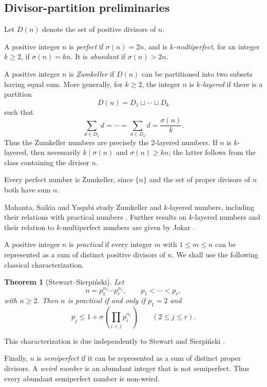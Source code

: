 \documentclass[11pt,reqno]{amsart}
\numberwithin{equation}{section}
\theoremstyle{plain}
\newtheorem{theorem}{Theorem}[section]
\theoremstyle{definition}
\theoremstyle{remark}
\begin{document}
\subsection{Divisor-partition preliminaries}

Let $D(n)$ denote the set of positive divisors of $n$.

A positive integer $n$ is \emph{perfect} if $\sigma(n)=2n$, and is \emph{$k$-multiperfect}, for an integer $k\ge2$, if $\sigma(n)=kn$. It is \emph{abundant} if $\sigma(n)>2n$.

A positive integer $n$ is \emph{Zumkeller} if $D(n)$ can be partitioned into two subsets having equal sum. More generally, for $k\ge2$, the integer $n$ is \emph{$k$-layered} if there is a partition
\[
D(n)=D_1\sqcup\cdots\sqcup D_k
\]
such that
\[
\sum_{d\in D_1}d
=
\cdots
=
\sum_{d\in D_k}d
=
\frac{\sigma(n)}{k}.
\]
Thus the Zumkeller numbers are precisely the $2$-layered numbers. If $n$ is $k$-layered, then necessarily $k\mid\sigma(n)$ and $\sigma(n)\ge kn$; the latter follows from the class containing the divisor $n$.

Every perfect number is Zumkeller, since $\{n\}$ and the set of proper divisors of $n$ both have sum $n$.

Mahanta, Saikia and Yaqubi study Zumkeller and $k$-layered numbers, including their relations with practical numbers
\cite{MahantaSaikiaYaqubi2020}. Further results on $k$-layered numbers and their relation to $k$-multiperfect numbers are given by Jokar
\cite{Jokar2022}.

A positive integer $n$ is \emph{practical} if every integer $m$ with $1\le m\le n$ can be represented as a sum of distinct positive divisors of $n$. We shall use the following classical characterization.

\begin{theorem}[Stewart--Sierpi\'nski]\label{thm:practical}
Let
\[
n=p_1^{\alpha_1}\cdots p_r^{\alpha_r},
\qquad
p_1<\cdots<p_r,
\]
with $n\ge2$. Then $n$ is practical if and only if $p_1=2$ and
\[
p_j
\le
1+
\sigma\!\left(
\prod_{i<j}p_i^{\alpha_i}
\right)
\qquad (2\le j\le r).
\]
\end{theorem}

This characterization is due independently to Stewart and Sierpi\'nski
\cite{Stewart1954,Sierpinski1955}.

Finally, $n$ is \emph{semiperfect} if it can be represented as a sum of distinct proper divisors. A \emph{weird number} is an abundant integer that is not semiperfect. Thus every abundant semiperfect number is non-weird.
\end{document}
